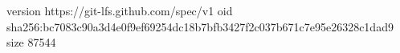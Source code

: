 version https://git-lfs.github.com/spec/v1
oid sha256:bc7083c90a3d4e0f9ef69254dc18b7bfb3427f2c037b671c7e95e26328c1dad9
size 87544
